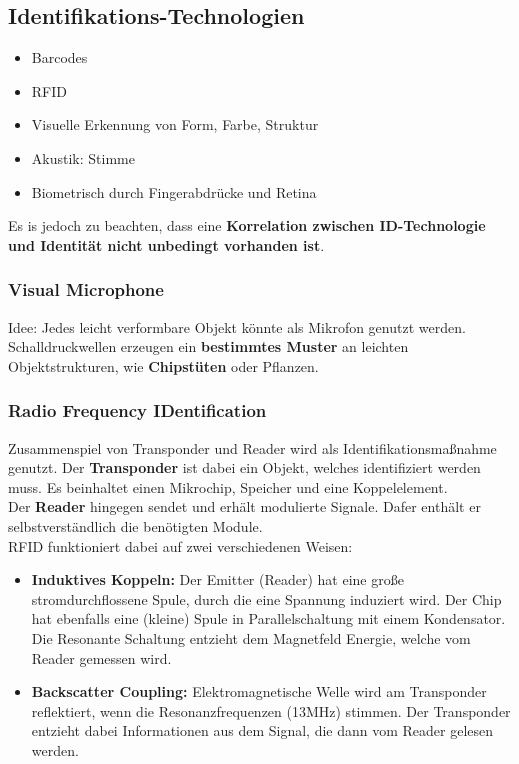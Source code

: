 \documentclass[a4paper]{article}
\begin{document}
\subsection{Identifikations-Technologien}
\begin{itemize}
	\item Barcodes
	\item RFID
	\item Visuelle Erkennung von Form, Farbe, Struktur
	\item Akustik: Stimme
	\item Biometrisch durch Fingerabdrücke und Retina
\end{itemize}
Es is jedoch zu beachten, dass eine \textbf{Korrelation zwischen ID-Technologie und Identität nicht unbedingt vorhanden ist}.
\subsubsection{Visual Microphone}
Idee: Jedes leicht verformbare Objekt könnte als Mikrofon genutzt werden. Schalldruckwellen erzeugen ein \textbf{bestimmtes Muster} an leichten Objektstrukturen, wie \textbf{Chipstüten} oder Pflanzen.
\subsubsection{Radio Frequency IDentification}
Zusammenspiel von Transponder und Reader wird als Identifikationsmaßnahme genutzt.
Der \textbf{Transponder} ist dabei ein Objekt, welches identifiziert werden muss. Es beinhaltet einen Mikrochip, Speicher und eine Koppelelement.\\
Der \textbf{Reader} hingegen sendet und erhält modulierte Signale. Dafer enthält er selbstverständlich die benötigten Module.\\

RFID funktioniert dabei auf zwei verschiedenen Weisen:
\begin{itemize}
	\item \textbf{Induktives Koppeln:} Der Emitter (Reader) hat eine große stromdurchflossene Spule, durch die eine Spannung induziert wird. Der Chip hat ebenfalls eine (kleine) Spule in Parallelschaltung mit einem Kondensator. Die Resonante Schaltung entzieht dem Magnetfeld Energie, welche vom Reader gemessen wird.
	\item \textbf{Backscatter Coupling:} Elektromagnetische Welle wird am Transponder reflektiert, wenn die Resonanzfrequenzen (13MHz) stimmen. Der Transponder entzieht dabei Informationen aus dem Signal, die dann vom Reader gelesen werden.
\end{itemize}
\end{document}
